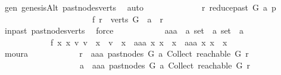 \begin{isabellebody}
\ gen\ genesisAlt\ past{\isacharunderscore}{\kern0pt}nodes{\isacharunderscore}{\kern0pt}verts\ \isamarkupfalse%
\ auto\ \ \isanewline
\ \ \ \ \ \ \ \ \isamarkupfalse%
\ \isamarkupfalse%
\ {\isachardoublequoteopen}r\ {\isasymrightarrow}\isactrlsup {\isacharasterisk}{\kern0pt}\isactrlbsub reduce{\isacharunderscore}{\kern0pt}past\ G\ a\isactrlesub \ p{\isachardoublequoteclose}\isanewline
\ \ \ \ \ \ \ \ \isamarkupfalse%
\ {\isacharminus}{\kern0pt}\isanewline
\ \ \ \ \ \ \ \ \ \ \isamarkupfalse%
\ f{}{\isacharcolon}{\kern0pt}\ {\isachardoublequoteopen}r\ {\isasymin}\ verts\ G\ {\isasymand}\ a\ {\isasymrightarrow}\isactrlsup {\isacharplus}{\kern0pt}\ r{\isachardoublequoteclose}\isanewline
\ \ \ \ \ \ \ \ \ \ \ \ \isamarkupfalse%
\ in{\isacharunderscore}{\kern0pt}past\ past{\isacharunderscore}{\kern0pt}nodes{\isacharunderscore}{\kern0pt}verts\ \isamarkupfalse%
\ force\isanewline
\ \ \ \ \ \ \ \ \ \ \isamarkupfalse%
\ aaa\ {\isacharcolon}{\kern0pt}{\isacharcolon}{\kern0pt}\ {\isachardoublequoteopen}{\isacharprime}{\kern0pt}a\ set\ {\isasymRightarrow}\ {\isacharprime}{\kern0pt}a\ set\ {\isasymRightarrow}\ {\isacharprime}{\kern0pt}a{\isachardoublequoteclose}\ \isanewline
\ \ \ \ \ \ \ \ \ \ \ \ f{}{\isacharcolon}{\kern0pt}\ {\isachardoublequoteopen}{\isasymforall}x{}\ x{}{\isachardot}{\kern0pt}\ {\isacharparenleft}{\kern0pt}{\isasymexists}v{}{\isachardot}{\kern0pt}\ v{}\ {\isasymin}\ x{}\ {\isasymand}\ v{}\ {\isasymnotin}\ x{}{\isacharparenright}{\kern0pt}\ {\isacharequal}{\kern0pt}\ {\isacharparenleft}{\kern0pt}aaa\ x{}\ x{}\ {\isasymin}\ x{}\ {\isasymand}\ aaa\ x{}\ x{}\ {\isasymnotin}\ x{}{\isacharparenright}{\kern0pt}{\isachardoublequoteclose}\isanewline
\ \ \ \ \ \ \ \ \ \ \ \ \isamarkupfalse%
\ moura\isanewline
\ \ \ \ \ \ \ \ \ \ \isamarkupfalse%
\ {\isachardoublequoteopen}r\ {\isasymrightarrow}\isactrlsup {\isacharasterisk}{\kern0pt}\ aaa\ {\isacharparenleft}{\kern0pt}past{\isacharunderscore}{\kern0pt}nodes\ G\ a{\isacharparenright}{\kern0pt}\ {\isacharparenleft}{\kern0pt}Collect\ {\isacharparenleft}{\kern0pt}reachable\ G\ r{\isacharparenright}{\kern0pt}{\isacharparenright}{\kern0pt}\isanewline
\ \ \ \ \ \ \ \ \ \ \ \ \ \ \ \ \ \ {\isasymlongrightarrow}\ a\ {\isasymrightarrow}\isactrlsup {\isacharplus}{\kern0pt}\ aaa\ {\isacharparenleft}{\kern0pt}past{\isacharunderscore}{\kern0pt}nodes\ G\ a{\isacharparenright}{\kern0pt}\ {\isacharparenleft}{\kern0pt}Collect\ {\isacharparenleft}{\kern0pt}reachable\ G\ r{\isacharparenright}{\kern0pt}{\isacharparenright}{\kern0pt}{\isachardoublequoteclose}\isanewline

\end{isabellebody}
